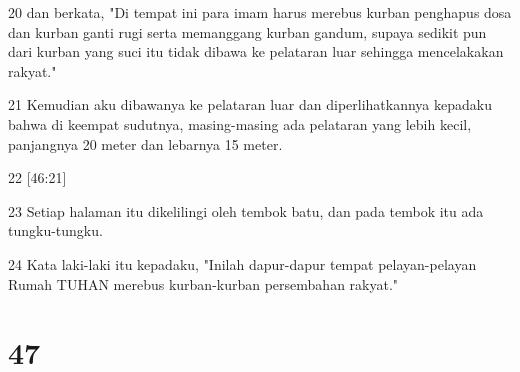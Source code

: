 \par 20 dan berkata, "Di tempat ini para imam harus merebus kurban penghapus dosa dan kurban ganti rugi serta memanggang kurban gandum, supaya sedikit pun dari kurban yang suci itu tidak dibawa ke pelataran luar sehingga mencelakakan rakyat."
\par 21 Kemudian aku dibawanya ke pelataran luar dan diperlihatkannya kepadaku bahwa di keempat sudutnya, masing-masing ada pelataran yang lebih kecil, panjangnya 20 meter dan lebarnya 15 meter.
\par 22 [46:21]
\par 23 Setiap halaman itu dikelilingi oleh tembok batu, dan pada tembok itu ada tungku-tungku.
\par 24 Kata laki-laki itu kepadaku, "Inilah dapur-dapur tempat pelayan-pelayan Rumah TUHAN merebus kurban-kurban persembahan rakyat."

\chapter{47}

